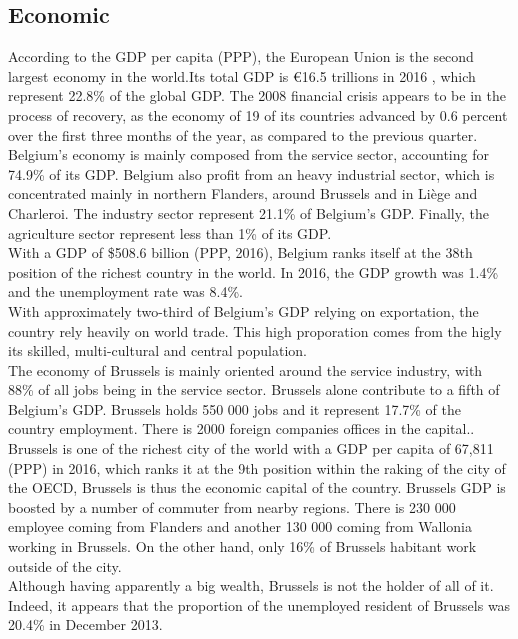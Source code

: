 \documentclass[12pt,a4paper,oneside]{book}
\begin{document}
\subsection{Economic}
According to the GDP per capita (PPP), the European Union is the second largest economy in the world.Its total GDP is \euro 16.5 trillions in 2016 , which represent 22.8\% of the global GDP\cite{imfgdp}. The 2008 financial crisis appears to be in the process of recovery, as the economy of 19 of its countries advanced by 0.6 percent over the first three months of the year, as compared to the previous quarter\cite{eurorecov}.\\

Belgium's economy is mainly composed from the service sector, accounting for 74.9\% of its GDP. Belgium also profit from an heavy industrial sector, which is concentrated mainly in northern Flanders, around Brussels and in Liège and Charleroi. The industry sector represent 21.1\% of Belgium's GDP. Finally, the agriculture sector represent less than 1\% of its GDP.\\
With a GDP of \$508.6 billion (PPP, 2016), Belgium ranks itself at the 38th position of the richest country in the world. In 2016, the GDP growth was 1.4\% and the unemployment rate was 8.4\%.\\
With approximately two-third of Belgium's GDP relying on exportation, the country rely heavily on world trade. This high proporation comes from the higly its skilled, multi-cultural and central population\cite{ciafb}.\\

The economy of Brussels is mainly oriented around the service industry, with 88\% of all jobs being in the service sector. Brussels alone contribute to a fifth of Belgium's GDP. Brussels holds 550 000 jobs and it represent 17.7\% of the country employment. There is 2000 foreign companies offices in the capital.\cite{bxinfo}.\\
Brussels is one of the richest city of the world with a GDP per capita of 67,811 (PPP) in 2016, which ranks it at the 9th position within the raking of the city of the OECD\cite{oecdstat}, Brussels is thus the economic capital of the country. Brussels GDP is boosted by a number of commuter from nearby regions. There is 230 000 employee coming from Flanders and another 130 000 coming from Wallonia working in Brussels. On the other hand, only 16\% of Brussels habitant work outside of the city\cite{euresCom}.\\
Although having apparently a big wealth, Brussels is not the holder of all of it. Indeed, it appears that the proportion of the unemployed resident of Brussels was 20.4\% in December 2013\cite{unemploybx}.
\end{document}
